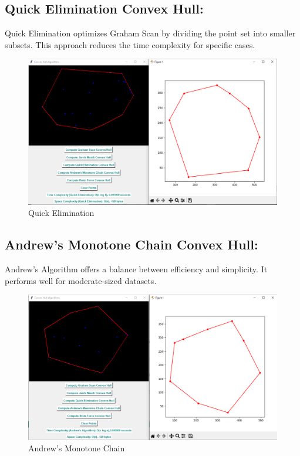 \subsection{\textbf{Quick Elimination Convex Hull:}}

Quick Elimination optimizes Graham Scan by dividing the point set into smaller subsets. This approach reduces the time complexity for specific cases.

\begin{figure}[h]
    \centering
    \includegraphics[width=1\linewidth]{quick elimination.PNG}
    \caption{Quick Elimination}
    \label{fig:quick elimination}
\end{figure}

\vspace{10pt}

\subsection{\textbf{Andrew’s Monotone Chain Convex Hull:}}

Andrew’s Algorithm offers a balance between efficiency and simplicity. It performs well for moderate-sized datasets.

\begin{figure}[h]
    \centering
    \includegraphics[width=1\linewidth]{andrew.PNG}
    \caption{Andrew's Monotone Chain}
    \label{fig:andrew}
\end{figure}

